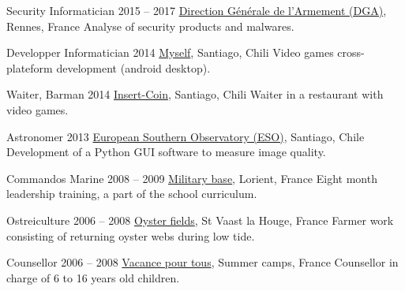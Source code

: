 \begin{joblist}[13.2][7.8][3]

\item[Security Informatician]{2015 -- 2017}
	{
	\href{http://www.defense.gouv.fr/dga/}{Direction Générale de l'Armement (DGA)}, Rennes, France
	}
	{Analyse of security products and malwares.}


\item[Developper Informatician]{2014}
	{
	\href{https://play.google.com/store/apps/developer?id=tinmarino&hl=en}{Myself}, Santiago, Chili
	}
	{Video games cross-plateform development (android desktop).}


\item[Waiter, Barman]{2014}
	{
	\href{http://www.insertcoin.cl/}{Insert-Coin}, Santiago, Chili
	}
	{Waiter in a restaurant with video games.}


\item[Astronomer]{2013}
	{
	\href{http://www.eso.org/public/}{European Southern Observatory (ESO)}, Santiago, Chile
	}
	{Development of a Python GUI software to measure image quality.}

\item[Commandos Marine]{2008 -- 2009}
	{
	\href{http://www.defense.gouv.fr/marine/organisation/forces/fusiliers-marins-et-commandos/force-maritime-des-fusiliers-marins-et-commandos}{Military base}, Lorient, France
	}
	{Eight ­month leadership training, a part of the school curriculum.}


\item[Ostreiculture]{2006 -- 2008}
	{
	\href{http://huitresdesaintvaast.fr/}{Oyster fields}, St Vaast la Houge, France
	}
	{Farmer work consisting of returning oyster webs during low tide.}


\item[Counsellor]{2006 -- 2008}
	{
	\href{http://www.vacances-pour-tous.org/}{Vacance pour tous}, Summer camps, France
	}
	{Counsellor in charge of 6 to 16 years old children.}
	
	
\end{joblist}



